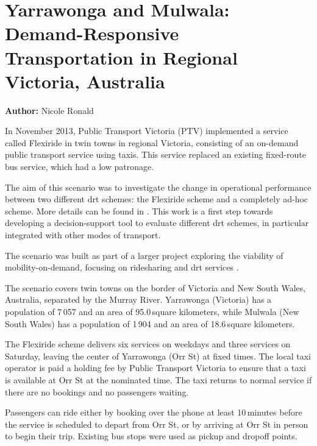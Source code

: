 \section{Yarrawonga and Mulwala: Demand-Responsive Transportation in Regional Victoria, Australia}
\label{sec:yarrawonga}
\hfill \textbf{Author:} Nicole Ronald

In November 2013, Public Transport Victoria (PTV) implemented a service called
Flexiride in twin towns in regional Victoria, consisting of an on-demand public
transport service using taxis. This service replaced an existing fixed-route bus
service, which had a low patronage.

The aim of this scenario was to investigate the change in operational
performance between two different \gls{drt} schemes: the Flexiride scheme and a
completely ad-hoc scheme. More details can be found in
\citep[][]{RonThoWin2015}. This work is a first step towards developing a
decision-support tool to evaluate different \gls{drt} schemes, in particular
integrated with other modes of transport. 

The scenario was built as part of a larger project exploring the viability of
mobility-on-demand, focusing on ridesharing and \gls{drt} services \citep[][]{Ronald_iMoD_2014}.

The scenario covers twin towns on the border of Victoria and New South Wales,
Australia, separated by the Murray River. Yarrawonga (Victoria) has a population
of 7\,057 and an area of 95.0\,square kilometers, while Mulwala (New South Wales) has a
population of 1\,904 and an area of 18.6\,square kilometers. 

The Flexiride scheme delivers six services on weekdays and three services on
Saturday, leaving the center of Yarrawonga (Orr St) at fixed times. The local
taxi operator is paid a holding fee by Public Transport Victoria to ensure that a taxi is available at
Orr St at the nominated time. The taxi returns to normal service if there are no
bookings and no passengers waiting.

Passengers can ride either by booking over the phone at least 10\,minutes before
the service is scheduled to depart from Orr St, or by arriving at Orr St in
person to begin their trip. Existing bus stops were used as pickup and dropoff
points.


